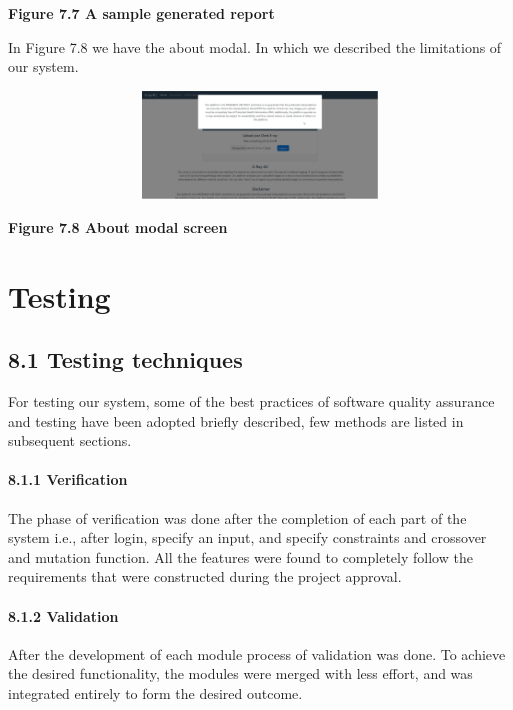 \documentclass{article} %
\begin{document}
\noindent \textbf{Figure 7.7 A sample generated report}

\noindent 

\noindent In Figure 7.8 we have the about modal. In which we described the limitations of our system.

\noindent \includegraphics*[width=6.43in, height=1.13in, keepaspectratio=false, trim=3.46in 4.40in 3.38in 0.57in]{image41}

\noindent \textbf{Figure 7.8 About modal screen}

\noindent 

\noindent \eject 

\noindent 


\section{ Testing}

\noindent 
\subsection{8.1 Testing techniques}

\noindent For testing our system, some of the best practices of software quality assurance and testing have been adopted briefly described, few methods are listed in subsequent sections.

\noindent 
\paragraph{8.1.1 Verification}

\noindent The phase of verification was done after the completion of each part of the system i.e., after login, specify an input, and specify constraints and crossover and mutation function. All the features were found to completely follow the requirements that were constructed during the project approval.

\noindent 
\paragraph{8.1.2 Validation}

\noindent After the development of each module process of validation was done. To achieve the desired functionality, the modules were merged with less effort, and was integrated entirely to form the desired outcome.
\end{document}
